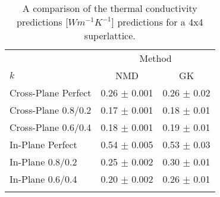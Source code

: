 \documentclass[aps,prb,preprint,preprintnumbers,amsmath,amssymb,floatfix,superscriptaddress]{revtex4}
\begin{document}
\begin{table}
\begin{center}
\begin{tabular}{lcc}
\hline\noalign{\smallskip}
&\multicolumn{2}{c}{Method} \\
\cline{2-3}\noalign{\smallskip}
$k$ & NMD  & GK  \\
\noalign{\smallskip}\hline\noalign{\smallskip}
Cross-Plane Perfect  & 0.26 $\pm$ 0.001& 0.26 $\pm$ 0.02\\
Cross-Plane 0.8/0.2    & 0.17  $\pm$ 0.001   &   0.18 $\pm$ 0.01 \\
Cross-Plane 0.6/0.4    & 0.18  $\pm$ 0.001   &   0.19 $\pm$ 0.01 \\
In-Plane Perfect   & 0.54 $\pm$ 0.005 & 0.53 $\pm$ 0.03  \\
In-Plane 0.8/0.2  & 0.25 $\pm$ 0.002 & 0.30 $\pm$ 0.01  \\
In-Plane 0.6/0.4   & 0.20 $\pm$ 0.002 & 0.26 $\pm$ 0.01  \\
\noalign{\smallskip}\hline
\end{tabular}
\end{center}
\renewcommand{\table}{Table.}
\caption{A comparison of the thermal conductivity predictions [$Wm^{-1}K^{-1}$] predictions for a 4x4 superlattice.}
\label{TB:validate}
\end{table}
\end{document}
